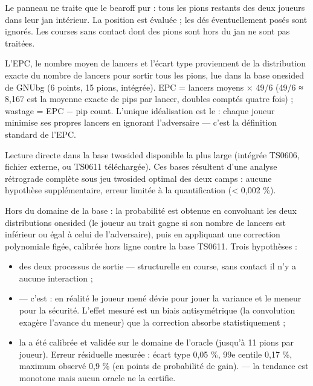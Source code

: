 \documentclass[letterpaper,10pt,french]{sphinxmanual}
\begin{document}
\sphinxAtStartPar
{} Le panneau ne traite que le bearoff pur : tous les pions restants
des deux joueurs dans leur jan intérieur. La position est évaluée  ; les dés éventuellement posés sont ignorés. Les courses sans contact
dont des pions sont hors du jan ne sont pas traitées.

\sphinxAtStartPar
{} L’EPC, le nombre moyen de lancers et
l’écart type proviennent de la distribution exacte du nombre de lancers pour
sortir tous les pions, lue dans la base one\sphinxhyphen{}sided de GNUbg (6 points,
15 pions, intégrée). EPC = lancers moyens × 49/6 (49/6 ≈ 8,167 est la moyenne
exacte de pips par lancer, doubles comptés quatre fois) ; wastage = EPC − pip
count. L’unique idéalisation est le  : chaque joueur
minimise ses propres lancers en ignorant l’adversaire — c’est la définition
standard de l’EPC.

\sphinxAtStartPar
{} Lecture directe dans la base two\sphinxhyphen{}sided
disponible la plus large (intégrée TS\sphinxhyphen{}06\sphinxhyphen{}06, fichier externe, ou TS\sphinxhyphen{}06\sphinxhyphen{}11
téléchargée). Ces bases résultent d’une analyse rétrograde complète sous jeu
two\sphinxhyphen{}sided optimal des deux camps : aucune hypothèse supplémentaire, erreur
limitée à la quantification (< 0,002 \%).

\sphinxAtStartPar
{} Hors du domaine de la base : la
probabilité est obtenue en convoluant les deux distributions one\sphinxhyphen{}sided (le
joueur au trait gagne si son nombre de lancers est inférieur ou égal à celui
de l’adversaire), puis en appliquant une correction polynomiale figée,
calibrée hors ligne contre la base TS\sphinxhyphen{}06\sphinxhyphen{}11. Trois hypothèses :
\begin{itemize}
\item {} 
\sphinxAtStartPar
{} des deux processus de sortie — structurelle en course,
sans contact il n’y a aucune interaction ;

\item {} 
\sphinxAtStartPar
{} — c’est  : en
réalité le joueur mené dévie pour jouer la variance et le meneur pour la
sécurité. L’effet mesuré est un biais antisymétrique (la convolution
exagère l’avance du meneur) que la correction absorbe statistiquement ;

\item {} 
\sphinxAtStartPar
la  a été calibrée et validée sur le domaine de l’oracle
(jusqu’à 11 pions par joueur). Erreur résiduelle mesurée : écart type
0,05 \%, 99e centile 0,17 \%, maximum observé 0,9 \% (en points de
probabilité de gain).  — la tendance est monotone mais aucun oracle ne la certifie.

\end{itemize}
\end{document}
